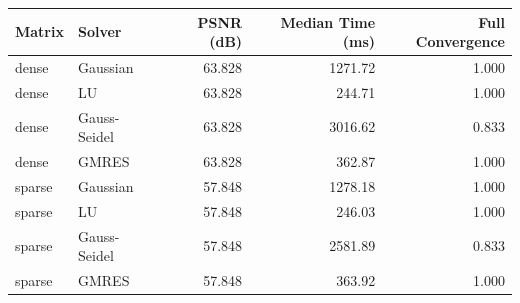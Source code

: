 \begin{tabular}{llrrr}
\toprule
Matrix & Solver & PSNR (dB) & Median Time (ms) & Full Convergence\\
\midrule
dense & Gaussian & 63.828 & 1271.72 & 1.000\\
dense & LU & 63.828 & 244.71 & 1.000\\
dense & Gauss-Seidel & 63.828 & 3016.62 & 0.833\\
dense & GMRES & 63.828 & 362.87 & 1.000\\
sparse & Gaussian & 57.848 & 1278.18 & 1.000\\
sparse & LU & 57.848 & 246.03 & 1.000\\
sparse & Gauss-Seidel & 57.848 & 2581.89 & 0.833\\
sparse & GMRES & 57.848 & 363.92 & 1.000\\
\bottomrule
\end{tabular}
